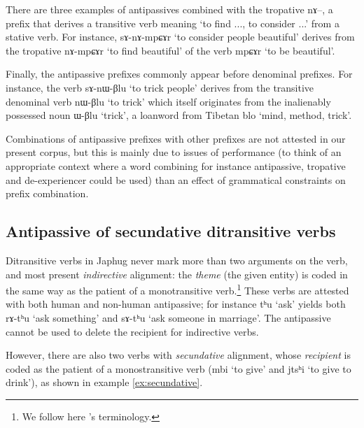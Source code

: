 \documentclass[oldfontcommands,oneside,a4paper,11pt]{article}
\newcommand{\ipa}[1]{{\phon \mbox{#1}}} %
\begin{document}
There are three examples of antipassives combined with the tropative \ipa{nɤ}--, a prefix that derives a transitive verb meaning `to find ..., to consider ...' from a stative verb. For instance,  \ipa{sɤ-nɤ-mpɕɤr} `to consider people beautiful'  derives from the tropative \ipa{nɤ-mpɕɤr} `to find beautiful' of the verb \ipa{mpɕɤr} `to be beautiful'.


Finally, the antipassive prefixes commonly appear before denominal prefixes. For instance, the verb \ipa{sɤ-nɯ-βlu} `to trick people' derives from the transitive denominal verb \ipa{nɯ-βlu} `to trick' which itself originates from the inalienably possessed noun \ipa{ɯ-βlu} `trick', a loanword from Tibetan \ipa{blo} `mind, method, trick'.

Combinations of antipassive prefixes with other prefixes are not attested in our present corpus, but this is mainly due to issues of performance (to think of an appropriate context where a word combining for instance antipassive, tropative and de-experiencer could be used) than an effect of grammatical constraints on prefix combination.


 \subsection{Antipassive of secundative ditransitive verbs} \label{subsec:ditr}
 Ditransitive verbs in Japhug never mark more than two arguments on the verb, and most present \textit{indirective} alignment: the \textit{theme} (the given entity) is coded in the same way as the patient of a monotransitive verb.\footnote{We follow here \citet{malchukov10ditransitive}'s terminology.} These verbs are attested with both human and non-human antipassive; for instance \ipa{tʰu} `ask' yields both \ipa{rɤ-tʰu} `ask something' and \ipa{sɤ-tʰu} `ask someone in marriage'. The antipassive cannot be used to delete the recipient for indirective verbs.
 
However, there are also  two verbs with \textit{secundative} alignment, whose \textit{recipient} is coded as the patient of a monostransitive verb  (\ipa{mbi} `to give' and \ipa{jtsʰi} `to give  to drink'), as shown in example \ref{ex:secundative}.
 
\end{document}
